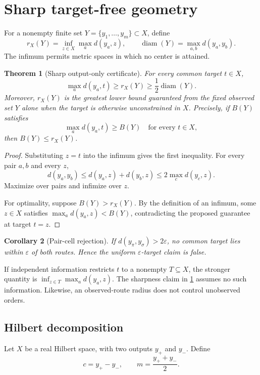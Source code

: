 \documentclass[10pt]{article}
\newtheorem{theorem}{Theorem}[section]
\newtheorem{corollary}[theorem]{Corollary}
\theoremstyle{definition}
\theoremstyle{remark}
\newcommand{\diam}{\operatorname{diam}}
\newcommand{\eps}{\varepsilon}
\begin{document}
\section{Sharp target-free geometry}

For a nonempty finite set \(Y=\{y_1,\ldots,y_m\}\subset X\), define
\[
  r_X(Y)=\inf_{z\in X}\max_a d(y_a,z),
  \qquad
  \diam(Y)=\max_{a,b}d(y_a,y_b).
\]
The infimum permits metric spaces in which no center is attained.

\begin{theorem}[Sharp output-only certificate]
\label{thm:radius}
For every common target \(t\in X\),
\[
  \max_a d(y_a,t)
  \ge r_X(Y)
  \ge \frac12\diam(Y).
  \tag{4.1}
\]
Moreover, \(r_X(Y)\) is the greatest lower bound guaranteed from the fixed
observed set \(Y\) alone when the target is otherwise unconstrained in \(X\).
Precisely, if \(B(Y)\) satisfies
\[
  \max_a d(y_a,t)\ge B(Y)
  \quad\text{for every }t\in X,
\]
then \(B(Y)\le r_X(Y)\).
\end{theorem}

\begin{proof}
Substituting \(z=t\) into the infimum gives the first inequality. For every
pair \(a,b\) and every \(z\),
\[
 d(y_a,y_b)\le d(y_a,z)+d(y_b,z)
 \le 2\max_c d(y_c,z).
\]
Maximize over pairs and infimize over \(z\).

For optimality, suppose \(B(Y)>r_X(Y)\). By the definition of an infimum,
some \(z\in X\) satisfies \(\max_a d(y_a,z)<B(Y)\), contradicting the proposed
guarantee at target \(t=z\).
\end{proof}

\begin{corollary}[Pair-cell rejection]
\label{cor:pair}
If \(d(y_\pi,y_\sigma)>2\eps\), no common target lies within \(\eps\) of both
routes. Hence the uniform \(\eps\)-target claim is false.
\end{corollary}

If independent information restricts \(t\) to a nonempty \(T\subseteq X\), the
stronger quantity is \(\inf_{z\in T}\max_a d(y_a,z)\). The sharpness claim in
\cref{thm:radius} assumes no such information. Likewise, an observed-route
radius does not control unobserved orders.

\subsection{Hilbert decomposition}

Let \(X\) be a real Hilbert space, with two outputs \(y_+\) and \(y_-\). Define
\[
  c=y_+-y_-,
  \qquad
  m=\frac{y_++y_-}{2}.
\]
\end{document}
